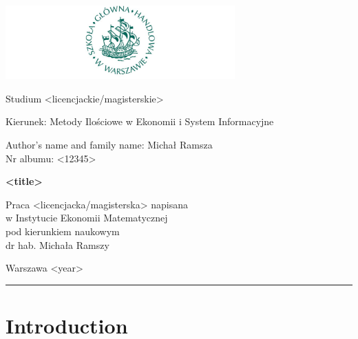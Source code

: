 \documentclass[english, twoside, 12pt, a4paper]{article}
\theoremstyle{definition}
\theoremstyle{plain}
\theoremstyle{remark}
\begin{document}
\begin{titlepage}
\centering

\includegraphics[width=0.66\textwidth]{logo.JPG}

\vspace*{0.5cm}
Studium <licencjackie/magisterskie>\\
\begin{flushleft}
Kierunek: Metody Ilościowe w Ekonomii i System Informacyjne\\
\end{flushleft}

\vspace*{.5cm}
\rule{0cm}{1cm}\hfill
\begin{minipage}{9cm}
Author's name and family name: Michał Ramsza\\
Nr albumu: <12345>
\end{minipage}

\vspace*{1cm}
\begin{minipage}{12cm}
\centering
\Large
\textbf{<title>}
\end{minipage}

\vspace*{2cm}
\rule{0cm}{1cm}\hfill
\begin{minipage}{9cm}
Praca <licencjacka/magisterska> napisana\\
w Instytucie Ekonomii Matematycznej\\
pod kierunkiem naukowym\\
dr hab. Michała Ramszy
\end{minipage}

\vfill
Warszawa <year>
\end{titlepage}

\rule{1ex}{0ex}\clearpage

\cleardoublepage
\tableofcontents

\cleardoublepage
\section{Introduction}
\end{document}
